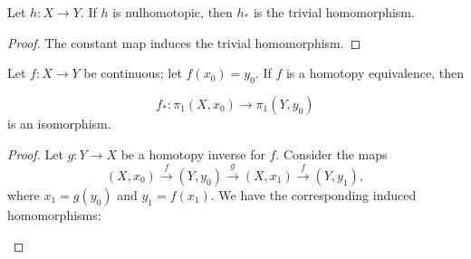 \begin{corollary}
\label{cor:\thetheorem}
Let \(h : X \rightarrow Y\). If \(h\) is nulhomotopic, then \(h_{ * }\) is the trivial homomorphism.
\end{corollary}

\begin{proof}
The constant map induces the trivial homomorphism.
\end{proof}
\begin{theorem}
\label{thm:\thetheorem}
Let \(f : X \rightarrow Y\) be continuous; let \(f( x_{0}) = y_{0}\). If \(f\) is a homotopy equivalence, then

\[
f_{ * } : {\pi }_{1}( {X,x_{0}}) \rightarrow {\pi }_{1}( {Y,y_{0}})
\]
is an isomorphism.
\end{theorem}

\begin{proof}
Let \(g : Y \rightarrow X\) be a homotopy inverse for \(f\). Consider the maps
\[
( {X,x_{0}}) \overset{f}{ \rightarrow }( {Y,y_{0}}) \overset{g}{ \rightarrow }( {X,x_{1}}) \overset{f}{ \rightarrow }( {Y,y_{1}}),
\]
where \(x_{1} = g( y_{0})\) and \(y_{1} = f( x_{1})\). We have the corresponding induced homomorphisms:

\par\nopagebreak
\begin{center}
	\label{fig:com_58_35}
\end{center}
\par\nopagebreak 


\end{proof}
